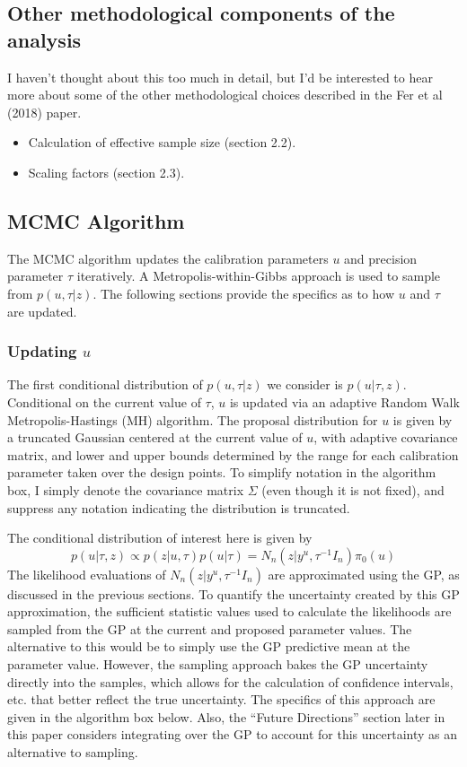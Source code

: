 \documentclass[12pt]{article}
\begin{document}
\subsection{Other methodological components of the analysis}
I haven't thought about this too much in detail, but I'd be interested to hear more about some of the other methodological choices described in the Fer et al (2018) paper. 
\begin{itemize}
\item Calculation of effective sample size (section 2.2).
\item Scaling factors (section 2.3). 
\end{itemize}

\subsection{MCMC Algorithm}
The MCMC algorithm updates the calibration parameters $u$ and precision parameter $\tau$ iteratively. A Metropolis-within-Gibbs approach is used to sample from $p(u, \tau|z)$. The following sections
provide the specifics as to how $u$ and $\tau$ are updated. 

\subsubsection{Updating $u$}
The first conditional distribution of $p(u, \tau|z)$ we consider is $p(u|\tau, z)$. Conditional on the current value of $\tau$, $u$ is updated via an adaptive Random Walk Metropolis-Hastings (MH) algorithm. The proposal 
distribution for $u$ is given by a truncated Gaussian centered at the current value of $u$, with adaptive covariance matrix, and lower and upper bounds determined by the range for each calibration parameter taken over the design points. To simplify notation in the algorithm box, I simply denote the covariance matrix $\Sigma$ (even though it is not fixed), and suppress any notation indicating the distribution is truncated. 

The conditional distribution of interest here is given by 
\[p(u|\tau, z) \propto p(z|u, \tau)p(u|\tau) = N_n(z|y^u, \tau^{-1}I_n) \pi_0(u)\]
The likelihood evaluations of $N_n(z|y^u, \tau^{-1}I_n)$ are approximated using the GP, as discussed in the previous sections. To quantify the uncertainty created by this GP approximation, the sufficient statistic values
used to calculate the likelihoods are sampled from the GP at the current and proposed parameter values. The alternative to this would be to simply use the GP predictive mean at the parameter value. 
However, the sampling approach bakes the GP uncertainty directly into the samples, which allows for the calculation of confidence intervals, etc. that better reflect the true uncertainty. The specifics of this approach are
given in the algorithm box below. Also, the ``Future Directions'' section later in this paper considers integrating over the GP to account for this uncertainty as an alternative to sampling. 
\end{document}
